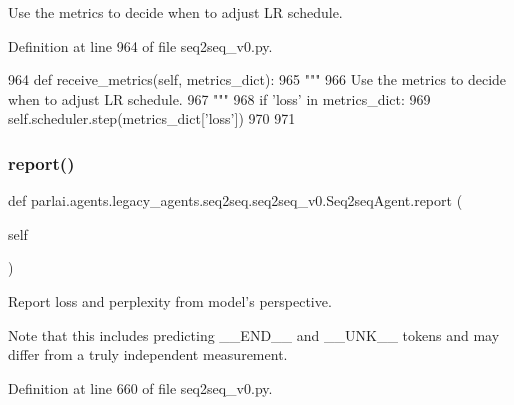 \begin{DoxyVerb}Use the metrics to decide when to adjust LR schedule.
\end{DoxyVerb}
 

Definition at line 964 of file seq2seq\+\_\+v0.\+py.


\begin{DoxyCode}
964     \textcolor{keyword}{def }receive\_metrics(self, metrics\_dict):
965         \textcolor{stringliteral}{"""}
966 \textcolor{stringliteral}{        Use the metrics to decide when to adjust LR schedule.}
967 \textcolor{stringliteral}{        """}
968         \textcolor{keywordflow}{if} \textcolor{stringliteral}{'loss'} \textcolor{keywordflow}{in} metrics\_dict:
969             self.scheduler.step(metrics\_dict[\textcolor{stringliteral}{'loss'}])
970 
971 
\end{DoxyCode}
\mbox{\label{classparlai_1_1agents_1_1legacy__agents_1_1seq2seq_1_1seq2seq__v0_1_1Seq2seqAgent_a83a444ecb418dfb4381147f23653dd7b}} 
\subsubsection{\texorpdfstring{report()}{report()}}
{\footnotesize\ttfamily def parlai.\+agents.\+legacy\+\_\+agents.\+seq2seq.\+seq2seq\+\_\+v0.\+Seq2seq\+Agent.\+report (\begin{DoxyParamCaption}\item[{}]{self }\end{DoxyParamCaption})}

\begin{DoxyVerb}Report loss and perplexity from model's perspective.

Note that this includes predicting __END__ and __UNK__ tokens and may differ
from a truly independent measurement.
\end{DoxyVerb}
 

Definition at line 660 of file seq2seq\+\_\+v0.\+py.


